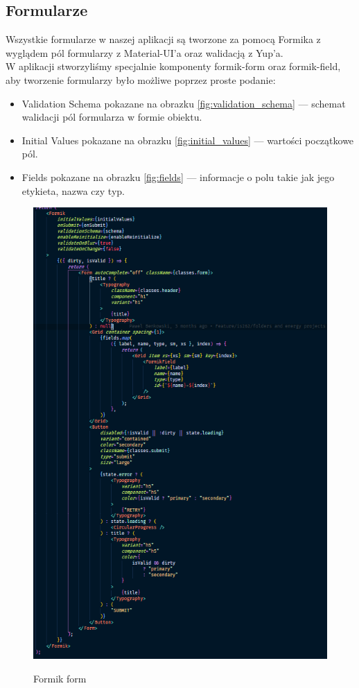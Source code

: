 \documentclass[a4paper,11pt]{report}
\begin{document}
\subsection{Formularze}
\label{subsec:forms}
Wszystkie formularze w naszej aplikacji są tworzone za pomocą Formika z wyglądem pól formularzy z Material-UI'a oraz walidacją z Yup'a.\\
W aplikacji stworzyliśmy specjalnie komponenty formik-form oraz formik-field, aby tworzenie formularzy było możliwe poprzez proste podanie:
\begin{itemize}
	\item Validation Schema pokazane na obrazku \ref{fig:validation_schema} — schemat walidacji pól formularza w formie obiektu.
	\item Initial Values pokazane na obrazku \ref{fig:initial_values} — wartości początkowe pól.
	\item Fields pokazane na obrazku \ref{fig:fields} — informacje o polu takie jak jego etykieta, nazwa czy typ.
\end{itemize}
\begin{figure}[H]
	\centering
	\includegraphics[scale=0.5]{implementacja/frontend/formik_form}\\
	\caption{Formik form}
	\label{fig:formik_form}
\end{figure}
\end{document}
